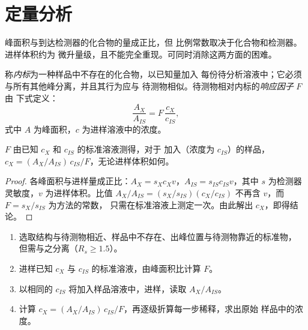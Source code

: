 \section{定量分析}

峰面积与到达检测器的化合物的量成正比，但
比例常数取决于化合物和检测器。进样体积约为
微升量级，且不能完全重现。可同时消除这两方面的困难。

\begin{definition}[响应因子与内标]\label{def:b2:chromatography:quantitative}
称\emph{内标}为一种样品中不存在的化合物，以已知量加入
每份待分析溶液中；它必须与所有其他峰分离，并且其行为应与
待测物相似。待测物相对内标的\emph{响应因子} $F$ 由
下式定义：
\begin{equation*}
\frac{A_X}{A_{IS}} = F\,\frac{c_X}{c_{IS}},
\end{equation*}
式中 $A$ 为峰面积，$c$ 为进样溶液中的浓度。
\end{definition}

\begin{proposition}[内标定量]\label{prop:b2:chromatography:internal-standard}
$F$ 由已知 $c_X$ 和 $c_{IS}$ 的标准溶液测得，对于
加入（浓度为 $c_{IS}$）的样品，$c_X = (A_X/A_{IS})\,c_{IS}/F$，无论进样体积如何。
\end{proposition}

\begin{proof}
各峰面积与进样量成正比：$A_X = s_X c_X v$，$A_{IS} = s_{IS} c_{IS} v$，其中
$s$ 为检测器灵敏度，$v$ 为进样体积。比值 $A_X/A_{IS} = (s_X/s_{IS})(c_X/c_{IS})$
不再含 $v$，而 $F = s_X/s_{IS}$ 为方法的常数，
只需在标准溶液上测定一次。由此解出 $c_X$，即得结论。
\end{proof}

\begin{method}[用内标法定量]\label{met:b2:chromatography:internal-standard}
\begin{enumerate}
  \item 选取结构与待测物相近、样品中不存在、出峰位置与待测物靠近的标准物，
        但需与之分离（$R_s \ge 1.5$）。
  \item 进样已知 $c_X$ 与 $c_{IS}$ 的标准溶液，由峰面积比计算 $F$。
  \item 以相同的 $c_{IS}$ 将加入样品溶液中，进样，读取 $A_X/A_{IS}$。
  \item 计算 $c_X = (A_X/A_{IS})\,c_{IS}/F$，再逐级折算每一步稀释，求出原始
        样品中的浓度。
\end{enumerate}
\end{method}

